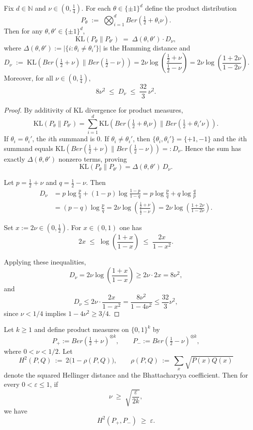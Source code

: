 \documentclass[arxiv]{colt2026}
\newcommand{\Ber}{Ber}
\newcommand{\eps}{\varepsilon}
\newcommand{\KL}{\mathrm{KL}}
\begin{document}
\begin{lemma}
\label{lem:kl-product-bernoulli}
Fix $d\in\mathbb N$ and $\nu\in(0,\tfrac14)$.
For each $\theta\in\{\pm1\}^d$ define the product distribution
\[
P_\theta \;:=\; \bigotimes_{i=1}^d \Ber\!\left(\tfrac12+\theta_i\nu\right).
\]
Then for any $\theta,\theta'\in\{\pm1\}^d$,
\[
\KL(P_\theta\|P_{\theta'})
\;=\;
\Delta(\theta,\theta')\cdot D_\nu,
\]
where $\Delta(\theta,\theta'):=|\{i:\theta_i\neq\theta_i'\}|$ is the Hamming distance and
\[
D_\nu
\;:=\;
\KL\!\left(\Ber\!\left(\tfrac12+\nu\right)\Big\|\Ber\!\left(\tfrac12-\nu\right)\right)
=
2\nu\log\!\left(\frac{\tfrac12+\nu}{\tfrac12-\nu}\right)
=
2\nu\log\!\left(\frac{1+2\nu}{1-2\nu}\right).
\]
Moreover, for all $\nu\in(0,\tfrac14)$,
\[
8\nu^2 \;\le\; D_\nu \;\le\; \frac{32}{3}\,\nu^2.
\]
\end{lemma}

\begin{proof}
By additivity of KL divergence for product measures,
\[
\KL(P_\theta\|P_{\theta'})
=
\sum_{i=1}^d
\KL\!\left(\Ber\!\left(\tfrac12+\theta_i\nu\right)\Big\|\Ber\!\left(\tfrac12+\theta_i'\nu\right)\right).
\]
If $\theta_i=\theta_i'$, the $i$th summand is $0$.
If $\theta_i\neq\theta_i'$, then $\{\theta_i,\theta_i'\}=\{+1,-1\}$ and the $i$th summand equals
$\KL(\Ber(\tfrac12+\nu)\|\Ber(\tfrac12-\nu))=:D_\nu$.
Hence the sum has exactly $\Delta(\theta,\theta')$ nonzero terms, proving
\[
\KL(P_\theta\|P_{\theta'})
=
\Delta(\theta,\theta')\,D_\nu.
\]

Let $p=\tfrac12+\nu$ and $q=\tfrac12-\nu$. Then
\begin{align*}
D_\nu
&=
p\log\frac{p}{q} + (1-p)\log\frac{1-p}{1-q}
=
p\log\frac{p}{q} + q\log\frac{q}{p}\\
&=
(p-q)\log\frac{p}{q}
=
2\nu\log\!\left(\frac{\tfrac12+\nu}{\tfrac12-\nu}\right)
=
2\nu\log\!\left(\frac{1+2\nu}{1-2\nu}\right).
\end{align*}

Set $x:=2\nu\in(0,\tfrac12)$.
For $x\in(0,1)$ one has
\[
2x
\;\le\;
\log\!\left(\frac{1+x}{1-x}\right)
\;\le\;
\frac{2x}{1-x^2}.
\]

Applying these inequalities,
\[
D_\nu
=
2\nu\log\!\left(\frac{1+x}{1-x}\right)
\ge
2\nu\cdot 2x
=
8\nu^2,
\]
and
\[
D_\nu
\le
2\nu\cdot \frac{2x}{1-x^2}
=
\frac{8\nu^2}{1-4\nu^2}
\le
\frac{32}{3}\nu^2,
\]
since $\nu<1/4$ implies $1-4\nu^2\ge 3/4$.
\end{proof}


\begin{lemma}
\label{lem:hellinger-product-bernoulli}
Let $k\ge 1$ and define product measures on $\{0,1\}^k$ by
\[
P_+ := \Ber\!\left(\tfrac12+\nu\right)^{\otimes k},
\qquad
P_- := \Ber\!\left(\tfrac12-\nu\right)^{\otimes k},
\]
where $0<\nu<1/2$. Let
\[
H^2(P,Q)\ :=\ 2\bigl(1-\rho(P,Q)\bigr),
\qquad
\rho(P,Q)\ :=\ \sum_{x}\sqrt{P(x)Q(x)}
\]
denote the squared Hellinger distance and the Bhattacharyya coefficient.
Then for every $0<\eps\le 1$, if
\[
\nu \;\ge\; \sqrt{\frac{\eps}{2k}},
\]
we have
\[
H^2(P_+,P_-) \;\ge\; \eps .
\]
\end{lemma}
\end{document}
